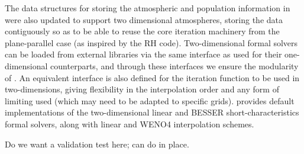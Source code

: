 The data structures for storing the atmospheric and population information in \Lw{} were also updated to support two dimensional atmospheres, storing the data contiguously so as to be able to reuse the core iteration machinery from the plane-parallel case (as inspired by the RH code).
Two-dimensional formal solvers can be loaded from external libraries via the same interface as used for their one-dimensional counterparts, and through these interfaces we ensure the modularity of \Lw{}.
An equivalent interface is also defined for the iteration function to be used in two-dimensions, giving flexibility in the interpolation order and any form of limiting used (which may need to be adapted to specific grids).
\Lw{} provides default implementations of the two-dimensional linear and BESSER short-characteristics formal solvers, along with linear and WENO4 interpolation schemes.

{\color{Red} Do we want a validation test here; can do in place.}